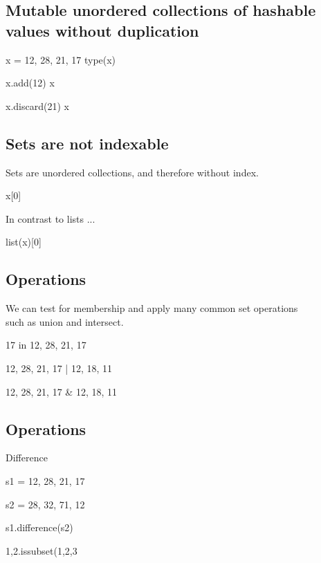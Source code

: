 \documentclass[aspectratio=1610,slidestop]{beamer}
\begin{document}
\subsection{Mutable unordered collections of hashable values without duplication}
\begin{pframe}
\begin{pyconsole}
x = {12, 28, 21, 17}
type(x)

x.add(12)
x

x.discard(21)
x
\end{pyconsole}
\end{pframe}

\subsection{Sets are not indexable}
\begin{pframe}
Sets are unordered collections, and therefore without index.
\begin{pyconsole}
x[0]
\end{pyconsole}
\medskip
\medskip

In contrast to lists ...
\begin{pyconsole}
list(x)[0]
\end{pyconsole}
\end{pframe}


\subsection{Operations}
\begin{pframe}
We can test for membership and apply many common set operations\\
such as union and intersect.
\medskip

\begin{pyconsole}
17 in {12, 28, 21, 17}

{12, 28, 21, 17} | {12, 18, 11}

{12, 28, 21, 17} & {12, 18, 11}
\end{pyconsole}
\end{pframe}


\subsection{Operations}
\begin{pframe}
 Difference
 \medskip

\begin{pyconsole}
s1 = {12, 28, 21, 17}

s2 = {28, 32, 71, 12}

s1.difference(s2)

{1,2}.issubset({1,2,3}
\end{pyconsole}
\end{pframe}
\end{document}
